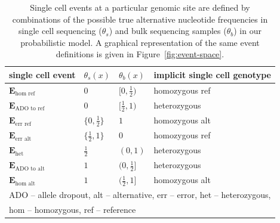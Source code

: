 \documentclass[authoryear,preprint,11pt]{scrartcl}
\begin{document}
\begin{center}
 \begin{table}[tbp]
  \caption{
   Single cell events at a particular genomic site are defined by combinations of the possible true alternative nucleotide frequencies in single cell sequencing ($\theta_s$) and bulk sequencing samples ($\theta_b$) in our probabilistic model.
   A graphical representation of the same event definitions is given in Figure~\ref{fig:event-space}.
  }
  \label{tab:Events}
  \renewcommand{\arraystretch}{0.9}

  \begin{tabular}{p{22ex}p{12ex}p{12ex}p{33ex}}
   \toprule
   single cell event & $\theta_s(x)$   & $\theta_b(x)$ & implicit single cell genotype \\
   \toprule
   $\boldsymbol{E}_{\text{hom ref}}$      & $0$             & $[0,\frac12)$ & homozygous ref                \\
       \midrule
   $\boldsymbol{E}_{\text{ADO to ref}}$   & $0$             & $[\frac12,1)$ & heterozygous                  \\
         \midrule
   $\boldsymbol{E}_{\text{err ref}}$      & $\{0,\frac12\}$ & $1$           & homozygous alt                \\
         \midrule
   $\boldsymbol{E}_{\text{err alt}}$      & $\{\frac12,1\}$ & $0$           & homozygous ref                \\
         \midrule
   $\boldsymbol{E}_{\text{het}}$          & $\frac12$       & $(0,1)$       & heterozygous                  \\
         \midrule
   $\boldsymbol{E}_{\text{ADO to alt}}$   & $1$             & $(0,\frac12]$ & heterozygous                  \\
       \midrule
   $\boldsymbol{E}_{\text{hom alt}}$      & $1$             & $(\frac12,1]$ & homozygous alt                \\
   \bottomrule
   \multicolumn{4}{l}{\footnotesize ADO -- allele dropout, alt -- alternative, err -- error, het -- heterozygous,}\\
   \multicolumn{4}{l}{\footnotesize hom -- homozygous, ref -- reference} \\
   \bottomrule
  \end{tabular}
 \end{table}
\end{center}
\end{document}
